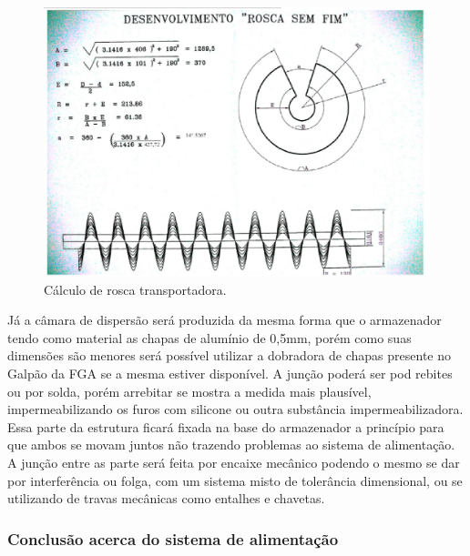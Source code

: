 \begin{figure}[H]
 \centering
   \includegraphics[keepaspectratio=true,scale=0.8]{figuras/calculo_de_roca.eps}
 \caption{Cálculo de rosca transportadora.}
 \label{calculo_rosca}
\end{figure}

Já a câmara de dispersão será produzida da mesma forma que o armazenador tendo como material as chapas de alumínio de 0,5mm, porém como suas dimensões são menores será possível utilizar a dobradora de chapas presente no Galpão da FGA se a mesma estiver disponível. A junção poderá ser pod rebites ou por solda, porém arrebitar se mostra a medida mais plausível, impermeabilizando os furos com silicone ou outra substância impermeabilizadora. Essa parte da estrutura ficará fixada na base do armazenador a princípio para que ambos se movam juntos não trazendo problemas ao sistema de alimentação. A junção entre as parte será feita por encaixe mecânico podendo o mesmo se dar por interferência ou folga, com um sistema misto de tolerância dimensional, ou se utilizando de travas mecânicas como entalhes e chavetas.

\subsubsection{Conclusão acerca do sistema de alimentação}

